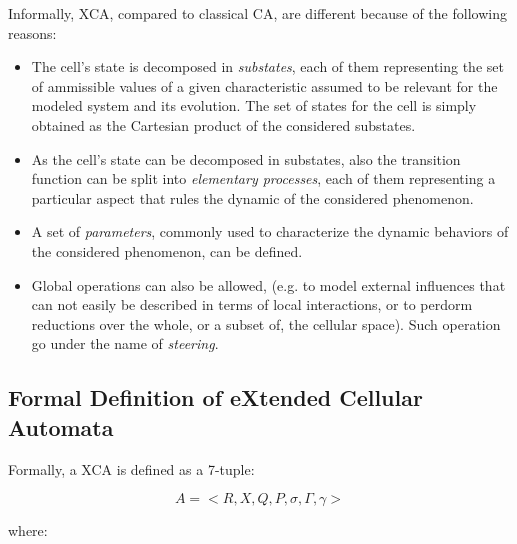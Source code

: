 Informally, XCA, compared to classical CA, are different because of
the following reasons:

\begin{itemize}

\item The cell's state is decomposed in \emph{substates}, each of them
  representing the set of ammissible values of a given characteristic
  assumed to be relevant for the modeled system and its evolution. The
  set of states for the cell is simply obtained as the Cartesian
  product of the considered substates.

\item As the cell's state can be decomposed in substates, also the
  transition function can be split into \emph{elementary processes},
  each of them representing a particular aspect that rules the dynamic
  of the considered phenomenon.

\item A set of \emph{parameters}, commonly used to characterize the dynamic behaviors of the considered phenomenon, can be defined.

\item Global operations can also be allowed, (e.g. to model external
  influences that can not easily be described in terms of local
  interactions, or to perdorm reductions over the whole, or a subset of,
  the cellular space). Such operation go under the name of
  \emph{steering}.
  
\end{itemize}


\subsection{Formal Definition of eXtended Cellular Automata}


Formally, a XCA is defined as a 7-tuple:

$$ A = <R,X,Q,P,\sigma,\Gamma,\gamma>$$

\noindent where:

